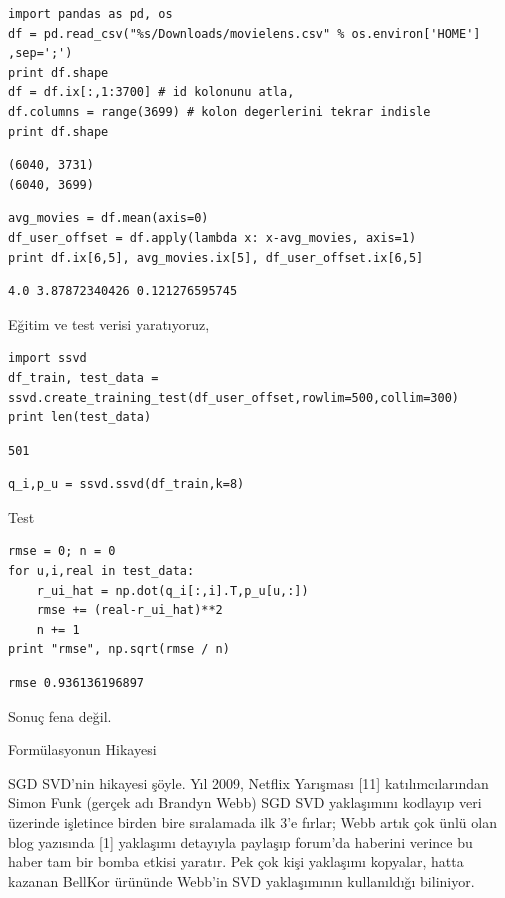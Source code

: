 \documentclass[12pt,fleqn]{article}\usepackage{../../common}
\begin{document}
\begin{verbatim}
import pandas as pd, os
df = pd.read_csv("%s/Downloads/movielens.csv" % os.environ['HOME'] ,sep=';')
print df.shape
df = df.ix[:,1:3700] # id kolonunu atla,
df.columns = range(3699) # kolon degerlerini tekrar indisle
print df.shape
\end{verbatim}

\begin{verbatim}
(6040, 3731)
(6040, 3699)
\end{verbatim}

\begin{verbatim}
avg_movies = df.mean(axis=0)
df_user_offset = df.apply(lambda x: x-avg_movies, axis=1)
print df.ix[6,5], avg_movies.ix[5], df_user_offset.ix[6,5]
\end{verbatim}

\begin{verbatim}
4.0 3.87872340426 0.121276595745
\end{verbatim}

Eğitim ve test verisi yaratıyoruz,

\begin{verbatim}
import ssvd
df_train, test_data = ssvd.create_training_test(df_user_offset,rowlim=500,collim=300)
print len(test_data)
\end{verbatim}

\begin{verbatim}
501
\end{verbatim}

\begin{verbatim}
q_i,p_u = ssvd.ssvd(df_train,k=8)
\end{verbatim}

Test

\begin{verbatim}
rmse = 0; n = 0
for u,i,real in test_data:
    r_ui_hat = np.dot(q_i[:,i].T,p_u[u,:])
    rmse += (real-r_ui_hat)**2
    n += 1
print "rmse", np.sqrt(rmse / n)
\end{verbatim}

\begin{verbatim}
rmse 0.936136196897
\end{verbatim}

Sonuç fena değil.

Formülasyonun Hikayesi

SGD SVD'nin hikayesi şöyle. Yıl 2009, Netflix Yarışması [11] katılımcılarından
Simon Funk (gerçek adı Brandyn Webb) SGD SVD yaklaşımını kodlayıp veri üzerinde
işletince birden bire sıralamada ilk 3'e fırlar; Webb artık çok ünlü olan blog
yazısında [1] yaklaşımı detayıyla paylaşıp forum'da haberini verince bu haber
tam bir bomba etkisi yaratır. Pek çok kişi yaklaşımı kopyalar, hatta kazanan
BellKor ürününde Webb'in SVD yaklaşımının kullanıldığı biliniyor.
\end{document}
